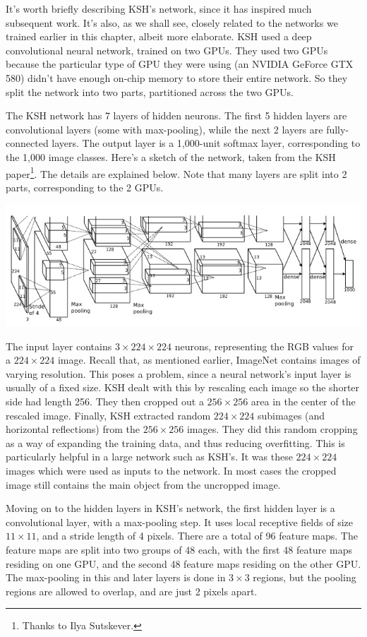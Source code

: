\documentclass[a4paper,twoside,10pt]{book}
\begin{document}
It's worth briefly describing KSH's network, since it has inspired much subsequent work. It's also, as we shall see, closely related to the networks we trained earlier in this chapter, albeit more elaborate. KSH used a deep convolutional neural network, trained on two GPUs. They used two GPUs because the particular type of GPU they were using (an NVIDIA GeForce GTX 580) didn't have enough on-chip memory to store their entire network. So they split the network into two parts, partitioned across the two GPUs.

The KSH network has 7 layers of hidden neurons. The first 5 hidden layers are convolutional layers (some with max-pooling), while the next 2 layers are fully-connected layers. The output layer is a 1,000-unit softmax layer, corresponding to the 1,000 image classes. Here's a sketch of the network, taken from the KSH paper\footnote{Thanks to Ilya Sutskever.}. The details are explained below. Note that many layers are split into 2 parts, corresponding to the 2 GPUs.
\begin{center}
	\includegraphics[width=\linewidth]{figures/ch6/KSH}
\end{center}
The input layer contains $3\times224\times224$ neurons, representing the RGB values for a $224\times224$ image. Recall that, as mentioned earlier, ImageNet contains images of varying resolution. This poses a problem, since a neural network's input layer is usually of a fixed size. KSH dealt with this by rescaling each image so the shorter side had length 256. They then cropped out a $256\times256$ area in the center of the rescaled image. Finally, KSH extracted random $224\times224$ subimages (and horizontal reflections) from the $256\times256$ images. They did this random cropping as a way of expanding the training data, and thus reducing overfitting. This is particularly helpful in a large network such as KSH's. It was these $224\times224$ images which were used as inputs to the network. In most cases the cropped image still contains the main object from the uncropped image.

Moving on to the hidden layers in KSH's network, the first hidden layer is a convolutional layer, with a max-pooling step. It uses local receptive fields of size $11\times11$, and a stride length of 4 pixels. There are a total of 96 feature maps. The feature maps are split into two groups of 48 each, with the first 48 feature maps residing on one GPU, and the second 48 feature maps residing on the other GPU. The max-pooling in this and later layers is done in $3\times3$ regions, but the pooling regions are allowed to overlap, and are just 2 pixels apart.
\end{document}

